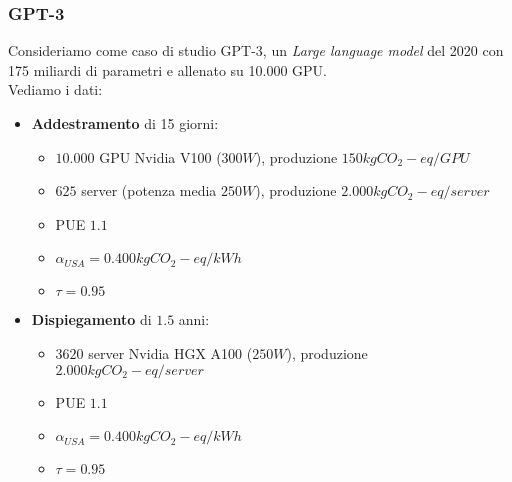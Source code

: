 \subsubsection{GPT-3}
Consideriamo come caso di studio GPT-3, un \textit{Large language model} del 2020 con 175 miliardi di parametri e allenato su 10.000 GPU.\\
Vediamo i dati:
\begin{itemize}
	\item \textbf{Addestramento} di 15 giorni:
	\begin{itemize}
		\item $10.000$ GPU Nvidia V100 ($300W$), produzione $150 kgCO_2-eq / GPU$
		\item $625$ server (potenza media $250W$), produzione $2.000 kgCO_2-eq/server$
		\item PUE $1.1$
		\item $\alpha_{USA}=0.400 kgCO_2-eq/kWh$
		\item $\tau=0.95$
	\end{itemize}
	\item \textbf{Dispiegamento} di $1.5$ anni:
	\begin{itemize}
		\item $3620$ server Nvidia HGX A100 ($250W$), produzione $2.000 kgCO_2-eq/server$
		\item PUE $1.1$
		\item $\alpha_{USA}=0.400 kgCO_2-eq/kWh$
		\item $\tau=0.95$
	\end{itemize}
\end{itemize}

